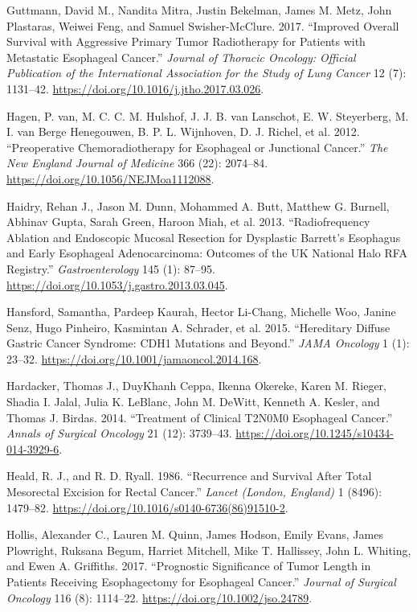\documentclass[
  letterpaper,
]{scrbook}
\newlength{\cslhangindent}
\newenvironment{CSLReferences}[2] %
 {\begin{list}{}{%
  \setlength{\itemindent}{0pt}
  \setlength{\leftmargin}{0pt}
  \setlength{\parsep}{0pt}
  \ifodd #1
   \setlength{\leftmargin}{\cslhangindent}
   \setlength{\itemindent}{-1\cslhangindent}
  \fi
  \setlength{\itemsep}{#2\baselineskip}}}
 {\end{list}}
\begin{document}
\begin{CSLReferences}{1}{0}
Guttmann, David M., Nandita Mitra, Justin Bekelman, James M. Metz, John
Plastaras, Weiwei Feng, and Samuel Swisher-McClure. 2017. {``Improved
{Overall} {Survival} with {Aggressive} {Primary} {Tumor} {Radiotherapy}
for {Patients} with {Metastatic} {Esophageal} {Cancer}.''} \emph{Journal
of Thoracic Oncology: Official Publication of the International
Association for the Study of Lung Cancer} 12 (7): 1131--42.
\url{https://doi.org/10.1016/j.jtho.2017.03.026}.

Hagen, P. van, M. C. C. M. Hulshof, J. J. B. van Lanschot, E. W.
Steyerberg, M. I. van Berge Henegouwen, B. P. L. Wijnhoven, D. J.
Richel, et al. 2012. {``Preoperative Chemoradiotherapy for Esophageal or
Junctional Cancer.''} \emph{The New England Journal of Medicine} 366
(22): 2074--84. \url{https://doi.org/10.1056/NEJMoa1112088}.

Haidry, Rehan J., Jason M. Dunn, Mohammed A. Butt, Matthew G. Burnell,
Abhinav Gupta, Sarah Green, Haroon Miah, et al. 2013. {``Radiofrequency
Ablation and Endoscopic Mucosal Resection for Dysplastic Barrett's
Esophagus and Early Esophageal Adenocarcinoma: Outcomes of the {UK}
{National} {Halo} {RFA} {Registry}.''} \emph{Gastroenterology} 145 (1):
87--95. \url{https://doi.org/10.1053/j.gastro.2013.03.045}.

Hansford, Samantha, Pardeep Kaurah, Hector Li-Chang, Michelle Woo,
Janine Senz, Hugo Pinheiro, Kasmintan A. Schrader, et al. 2015.
{``Hereditary {Diffuse} {Gastric} {Cancer} {Syndrome}: {CDH1}
{Mutations} and {Beyond}.''} \emph{JAMA Oncology} 1 (1): 23--32.
\url{https://doi.org/10.1001/jamaoncol.2014.168}.

Hardacker, Thomas J., DuyKhanh Ceppa, Ikenna Okereke, Karen M. Rieger,
Shadia I. Jalal, Julia K. LeBlanc, John M. DeWitt, Kenneth A. Kesler,
and Thomas J. Birdas. 2014. {``Treatment of Clinical {T2N0M0} Esophageal
Cancer.''} \emph{Annals of Surgical Oncology} 21 (12): 3739--43.
\url{https://doi.org/10.1245/s10434-014-3929-6}.

Heald, R. J., and R. D. Ryall. 1986. {``Recurrence and Survival After
Total Mesorectal Excision for Rectal Cancer.''} \emph{Lancet (London,
England)} 1 (8496): 1479--82.
\url{https://doi.org/10.1016/s0140-6736(86)91510-2}.

Hollis, Alexander C., Lauren M. Quinn, James Hodson, Emily Evans, James
Plowright, Ruksana Begum, Harriet Mitchell, Mike T. Hallissey, John L.
Whiting, and Ewen A. Griffiths. 2017. {``Prognostic Significance of
Tumor Length in Patients Receiving Esophagectomy for Esophageal
Cancer.''} \emph{Journal of Surgical Oncology} 116 (8): 1114--22.
\url{https://doi.org/10.1002/jso.24789}.


\end{CSLReferences}
\end{document}
